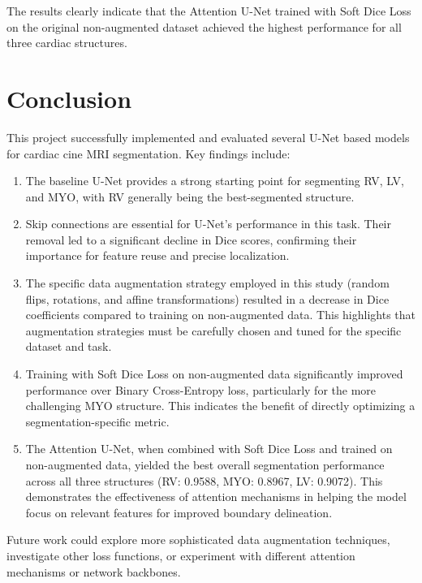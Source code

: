 \documentclass{article}
\begin{document}
The results clearly indicate that the Attention U-Net trained with Soft Dice Loss on the original non-augmented dataset achieved the highest performance for all three cardiac structures.


\section{Conclusion}
This project successfully implemented and evaluated several U-Net based models for cardiac cine MRI segmentation. Key findings include:
\begin{enumerate}
  \item The baseline U-Net provides a strong starting point for segmenting RV, LV, and MYO, with RV generally being the best-segmented structure.
  \item Skip connections are essential for U-Net's performance in this task. Their removal led to a significant decline in Dice scores, confirming their importance for feature reuse and precise localization.
  \item The specific data augmentation strategy employed in this study (random flips, rotations, and affine transformations) resulted in a decrease in Dice coefficients compared to training on non-augmented data. This highlights that augmentation strategies must be carefully chosen and tuned for the specific dataset and task.
  \item Training with Soft Dice Loss on non-augmented data significantly improved performance over Binary Cross-Entropy loss, particularly for the more challenging MYO structure. This indicates the benefit of directly optimizing a segmentation-specific metric.
  \item The Attention U-Net, when combined with Soft Dice Loss and trained on non-augmented data, yielded the best overall segmentation performance across all three structures (RV: 0.9588, MYO: 0.8967, LV: 0.9072). This demonstrates the effectiveness of attention mechanisms in helping the model focus on relevant features for improved boundary delineation.
\end{enumerate}
Future work could explore more sophisticated data augmentation techniques, investigate other loss functions, or experiment with different attention mechanisms or network backbones.
\end{document}
